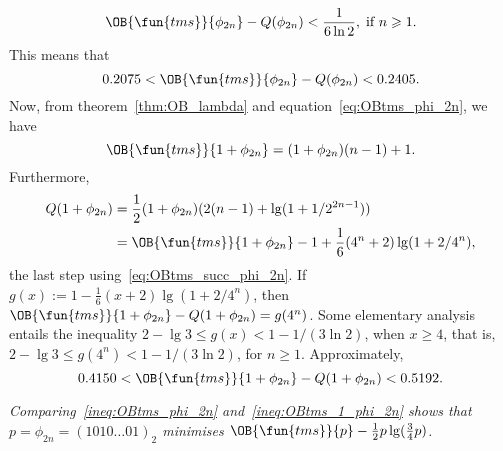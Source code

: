 \begin{itemize}
\begin{equation*}
    \OB{\fun{tms}}{\phi_{2n}} - Q(\phi_{2n}) < \frac{1}{6\ln 2},\; \text{if \(n
      \geqslant 1\)}.
    \end{equation*}
    This means that
    \begin{equation}
      0.2075 < \smash{\OB{\fun{tms}}{\phi_{2n}}} - Q(\phi_{2n}) <
      0.2405.
      \label{ineq:OBtms_phi_2n}
    \end{equation}
    Now, from theorem~\ref{thm:OB_lambda} and
    equation~\eqref{eq:OBtms_phi_2n}, we have
    \begin{equation}
      \OB{\fun{tms}}{1+\phi_{2n}} = (1+\phi_{2n})(n-1) + 1.
      \label{eq:OBtms_succ_phi_2n}
    \end{equation}
    Furthermore,
    \begin{align*}
      Q(1+\phi_{2n}) &= \frac{1}{2}(1+\phi_{2n}) (2(n-1) + \lg(1+1/2^{2n-1}))\\
                    &= \OB{\fun{tms}}{1+\phi_{2n}} - 1 +
      \frac{1}{6}(4^n + 2)\lg(1+2/4^n),
    \end{align*}
    the last step using~\eqref{eq:OBtms_succ_phi_2n}. If \(g(x) := 1 -
    \tfrac{1}{6}(x+2)\lg(1+2/4^n)\), then
    \(\OB{\fun{tms}}{1+\phi_{2n}} - Q(1+\phi_{2n}) = g(4^n)\). Some
    elementary analysis entails the inequality \(2 - \lg 3 \leqslant
    g(x) < 1 - 1/(3\ln 2)\), when \(x \geqslant 4\), that is, \(2 -
    \lg 3 \leqslant g(4^n) < 1 - 1/(3\ln 2)\), for \(n \geqslant
    1\). Approximately,
    \begin{equation}
      0.4150 < \smash{\OB{\fun{tms}}{1+\phi_{2n}}} - Q(1+\phi_{2n}) <
      0.5192.
      \label{ineq:OBtms_1_phi_2n}
    \end{equation}

    \bigskip \textsl{Comparing~\eqref{ineq:OBtms_phi_2n}
      and~\eqref{ineq:OBtms_1_phi_2n} shows that \(p=\phi_{2n} =
      (1010\dots01)_2\) minimises \(\OB{\fun{tms}}{p} -
      \tfrac{1}{2}p\lg(\tfrac{3}{4}p)\).}
    \bigskip


\end{itemize}
